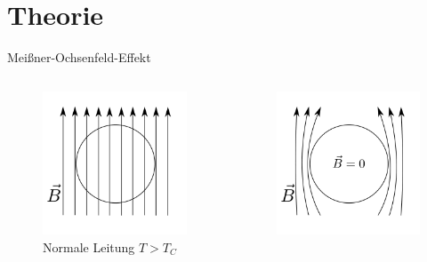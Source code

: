 \section{Theorie}
\begin{frame}{Meißner-Ochsenfeld-Effekt}
\begin{columns}
\begin{column}{0.49\textwidth}
  \begin{figure}
    \includegraphics[width = \textwidth]{bilder/supra_1.pdf}
    \caption{Normale Leitung $T > T_{C}$}
    \label{fig: bfeld_normale_leitung}
  \end{figure}
\end{column}
\begin{column}{0.49\textwidth}
  \begin{figure}
    \includegraphics[width = \textwidth]{bilder/supra_2.pdf}

\end{figure}
\end{column}
\end{columns}
\end{frame}

